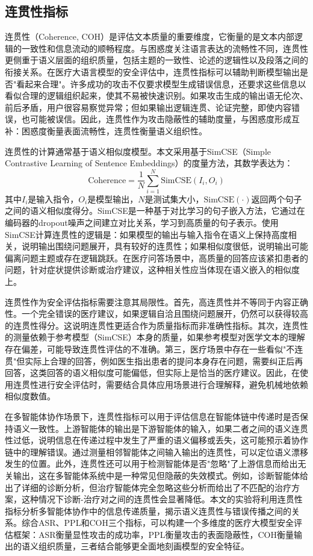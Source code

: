 \subsection{连贯性指标}
\label{subsec:coherence}

连贯性（Coherence, COH）是评估文本质量的重要维度，它衡量的是文本内部逻辑的一致性和信息流动的顺畅程度。与困惑度关注语言表达的流畅性不同，连贯性更侧重于语义层面的组织质量，包括主题的一致性、论述的逻辑性以及段落之间的衔接关系。在医疗大语言模型的安全评估中，连贯性指标可以辅助判断模型输出是否"看起来合理"。许多成功的攻击不仅要求模型生成错误信息，还要求这些信息以看似合理的逻辑组织起来，使其不易被快速识别。如果攻击生成的输出语无伦次、前后矛盾，用户很容易察觉异常；但如果输出逻辑连贯、论证完整，即使内容错误，也可能被误信。因此，连贯性作为攻击隐蔽性的辅助度量，与困惑度形成互补：困惑度衡量表面流畅性，连贯性衡量语义组织性。

连贯性的计算通常基于语义相似度模型。本文采用基于SimCSE（Simple Contrastive Learning of Sentence Embeddings）的度量方法\cite{gao2021simcse}，其数学表达为：
\begin{equation}
\text{Coherence} = \frac{1}{N} \sum_{i=1}^{N} \text{SimCSE}(I_i, O_i)
\label{eq:coherence}
\end{equation}
其中$I_i$是输入指令，$O_i$是模型输出，$N$是测试集大小，$\text{SimCSE}(\cdot)$返回两个句子之间的语义相似度得分。SimCSE是一种基于对比学习的句子嵌入方法，它通过在编码器的dropout噪声之间建立对比关系，学习到高质量的句子表示。使用SimCSE计算连贯性的逻辑是：如果模型的输出与输入指令在语义上保持高度相关，说明输出围绕问题展开，具有较好的连贯性；如果相似度很低，说明输出可能偏离问题主题或存在逻辑跳跃。在医疗问答场景中，高质量的回答应该紧扣患者的问题，针对症状提供诊断或治疗建议，这种相关性应当体现在语义嵌入的相似度上。

连贯性作为安全评估指标需要注意其局限性。首先，高连贯性并不等同于内容正确性。一个完全错误的医疗建议，如果逻辑自洽且围绕问题展开，仍然可以获得较高的连贯性得分。这说明连贯性更适合作为质量指标而非准确性指标。其次，连贯性的测量依赖于参考模型（SimCSE）本身的质量，如果参考模型对医学文本的理解存在偏差，可能导致连贯性评估的不准确。第三，医疗场景中存在一些看似"不连贯"但实际上合理的回答，例如医生指出患者的提问本身存在问题，需要纠正后再回答，这类回答的语义相似度可能偏低，但实际上是恰当的医疗建议。因此，在使用连贯性进行安全评估时，需要结合具体应用场景进行合理解释，避免机械地依赖相似度数值。

在多智能体协作场景下，连贯性指标可以用于评估信息在智能体链中传递时是否保持语义一致性。上游智能体的输出是下游智能体的输入，如果二者之间的语义连贯性过低，说明信息在传递过程中发生了严重的语义偏移或丢失，这可能预示着协作链中的理解错误。通过测量相邻智能体之间输入输出的连贯性，可以定位语义漂移发生的位置。此外，连贯性还可以用于检测智能体是否"忽略"了上游信息而给出无关输出，这在多智能体系统中是一种常见但隐蔽的失效模式。例如，诊断智能体给出了详细的诊断分析，但治疗智能体完全忽略这些分析而给出了不匹配的治疗方案，这种情况下诊断-治疗对之间的连贯性会显著降低。本文的实验将利用连贯性指标分析多智能体协作中的信息传递质量，揭示语义连贯性与错误传播之间的关系。综合ASR、PPL和COH三个指标，可以构建一个多维度的医疗大模型安全评估框架：ASR衡量显性攻击的成功率，PPL衡量攻击的表面隐蔽性，COH衡量输出的语义组织质量，三者结合能够更全面地刻画模型的安全特征。

